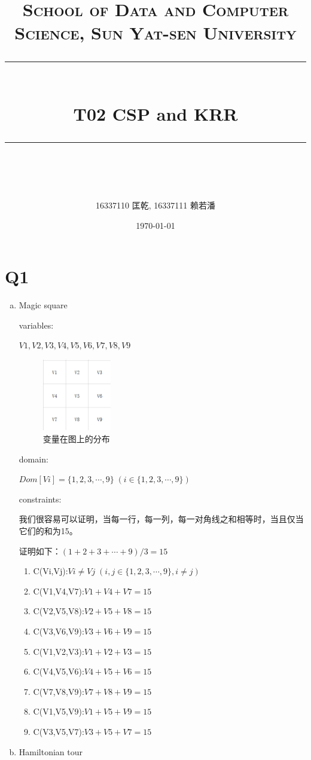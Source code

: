 \documentclass[a4paper, 11pt]{article}
\title{
\normalfont \normalsize
\textsc{School of Data and Computer Science, Sun Yat-sen University} \\ [25pt] %
\rule{\textwidth}{0.5pt} \\[0.4cm] %
\huge  T02 CSP and KRR\\ %
\rule{\textwidth}{2pt} \\[0.5cm] %
\author{16337110 匡乾, 16337111 赖若潘}
\date{\normalsize\today}
}
\begin{document}
\maketitle
\tableofcontents
\newpage
\section{Q1}
\begin{enumerate}[(a)]
\item
Magic square

	variables:

  $V1,V2,V3,V4,V5,V6,V7,V8,V9$

		\begin{figure}[htbp]
		  \centering
		  \includegraphics[width=3cm]{1}
		  \caption{变量在图上的分布}
		\end{figure}

	domain:

  $ Dom[Vi]=\{1,2,3, \cdots ,9\} \; (i \in \{1,2,3, \cdots ,9\}) $

	constraints:

		我们很容易可以证明，当每一行，每一列，每一对角线之和相等时，当且仅当它们的和为15。

		证明如下：$(1+2+3+ \cdots +9)/3 = 15$
    \begin{enumerate}[{1.}]
      \item C(Vi,Vj):$Vi \ne Vj \; (i,j \in \{1,2,3, \cdots ,9\},i \ne j)$
      \item C(V1,V4,V7):$V1+V4+V7=15$
      \item C(V2,V5,V8):$V2+V5+V8=15$
      \item C(V3,V6,V9):$V3+V6+V9=15$
      \item C(V1,V2,V3):$V1+V2+V3=15$
      \item C(V4,V5,V6):$V4+V5+V6=15$
      \item C(V7,V8,V9):$V7+V8+V9=15$
      \item C(V1,V5,V9):$V1+V5+V9=15$
      \item C(V3,V5,V7):$V3+V5+V7=15$
    \end{enumerate}

\item
Hamiltonian tour


\end{enumerate}
\end{document}
